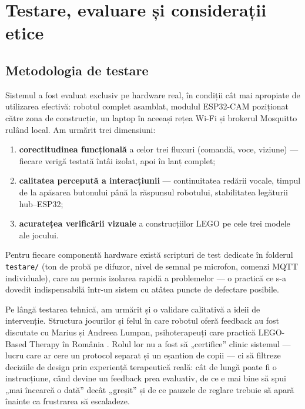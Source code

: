 \chapter{Testare, evaluare și considerații etice}
\label{an:cap:evaluare}

\section{Metodologia de testare}

Sistemul a fost evaluat exclusiv pe hardware real, în condiții cât mai apropiate de utilizarea efectivă: robotul complet asamblat, modulul ESP32-CAM poziționat către zona de construcție, un laptop în aceeași rețea Wi-Fi și brokerul Mosquitto rulând local. Am urmărit trei dimensiuni:

\begin{enumerate}
    \item \textbf{corectitudinea funcțională} a celor trei fluxuri (comandă, voce, viziune) — fiecare verigă testată întâi izolat, apoi în lanț complet;
    \item \textbf{calitatea percepută a interacțiunii} — continuitatea redării vocale, timpul de la apăsarea butonului până la răspunsul robotului, stabilitatea legăturii hub--ESP32;
    \item \textbf{acuratețea verificării vizuale} a construcțiilor LEGO pe cele trei modele ale jocului.
\end{enumerate}

Pentru fiecare componentă hardware există scripturi de test dedicate în folderul \texttt{testare/} (ton de probă pe difuzor, nivel de semnal pe microfon, comenzi MQTT individuale), care au permis izolarea rapidă a problemelor — o practică ce s-a dovedit indispensabilă într-un sistem cu atâtea puncte de defectare posibile.

Pe lângă testarea tehnică, am urmărit și o validare calitativă a ideii de intervenție. Structura jocurilor și felul în care robotul oferă feedback au fost discutate cu Marius și Andreea Lumpan, psihoterapeuți care practică LEGO-Based Therapy în România \cite{lumpanagerpres2025}. Rolul lor nu a fost să „certifice” clinic sistemul — lucru care ar cere un protocol separat și un eșantion de copii — ci să filtreze deciziile de design prin experiență terapeutică reală: cât de lungă poate fi o instrucțiune, când devine un feedback prea evaluativ, de ce e mai bine să spui „mai încearcă o dată” decât „greșit” și de ce pauzele de reglare trebuie să apară înainte ca frustrarea să escaladeze.

